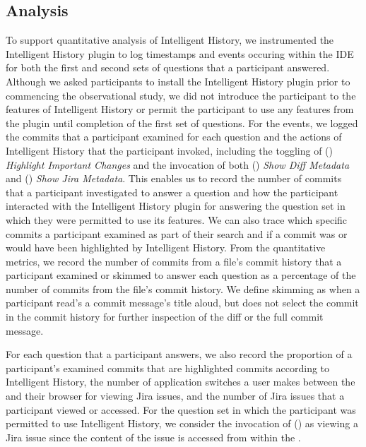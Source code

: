 \subsection{Analysis}
\label{subsec:Analysis}

To support quantitative analysis of Intelligent History, 
we instrumented the Intelligent History plugin to log timestamps and events occuring within the IDE
for both the first and second sets of questions that a participant answered.
Although we asked participants to install the Intelligent History plugin prior to commencing the
observational study, we did not introduce the participant to the features of Intelligent History 
or permit the participant to use any features from the plugin until completion of the first set of questions.
For the events, we logged the commits that a participant examined for each question 
and the actions of Intelligent History that the participant invoked,
including the toggling of () \textit{Highlight Important Changes} 
and the invocation of both () \textit{Show Diff Metadata} and () \textit{Show Jira Metadata}.
This enables us to record the number of commits that a participant investigated to answer a question 
and how the participant interacted with the Intelligent History plugin for answering the question set in which they were permitted to use its features.
We can also trace which specific commits a participant examined as part of their search and if a commit was 
or would have been highlighted by Intelligent History.
From the quantitative metrics, we record the number of commits from a file's commit history that a participant examined 
or skimmed to answer each question as a percentage of the number of commits from the file's commit history.
We define skimming as when a participant read's a commit message's title aloud, but does not select the commit in the commit history
for further inspection of the diff or the full commit message.

For each question that a participant answers, we also record the proportion of a participant's examined commits 
that are highlighted commits according to Intelligent History,
the number of application switches a user makes between the  and their browser for viewing Jira issues,
and the number of Jira issues that a participant viewed or accessed.
For the question set in which the participant was permitted to use Intelligent History, 
we consider the invocation of () as viewing a Jira issue since the content of the issue is accessed from within the .

